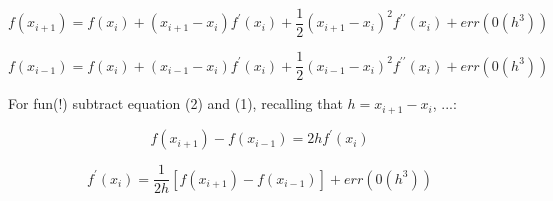 \documentclass[12pt]{article}
\begin{document}
\begin{equation}
 f(x_{i+1}) = f(x_i) + (x_{i+1} - x_i)f^{\prime}(x_i) + \frac{1}{2}(x_{i+1} - x_i)^2 f^{\prime\prime}(x_i) + err(0(h^3))
\end {equation}

\begin{equation}
 f(x_{i-1}) = f(x_i) + (x_{i-1} - x_i) f^{\prime}(x_i) + \frac{1}{2}(x_{i-1} - x_i)^2 f^{\prime\prime}(x_i) + err(0(h^3))
\end {equation}

For fun(!) subtract equation (2) and (1), recalling that $h = x_{i+1} - x_i$, ...:

\begin{equation}
 f(x_{i+1}) - f(x_{i-1}) = 2hf^{\prime}(x_i)
\end {equation}

\begin{equation}
 f^{\prime}(x_i) = \frac{1}{2h}[f(x_{i+1}) - f(x_{i-1})] + err(0(h^3))
 \end {equation}
\end{document}
